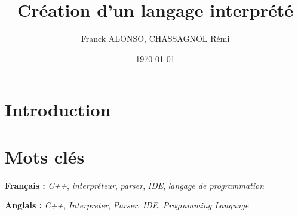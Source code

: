 \documentclass[a4paper]{article}
\title{Création d'un langage interprété}
\author{Franck ALONSO, CHASSAGNOL Rémi}
\date{\today}
\begin{document}
\maketitle

\section{Introduction}

\section{Mots clés}

\textbf{Français :} \textit{C++}, \textit{interpréteur}, \textit{parser},
\textit{IDE}, \textit{langage de programmation}

\textbf{Anglais :} \textit{C++}, \textit{Interpreter}, \textit{Parser},
\textit{IDE}, \textit{Programming Language}

\clearpage{}

{}
\end{document}
